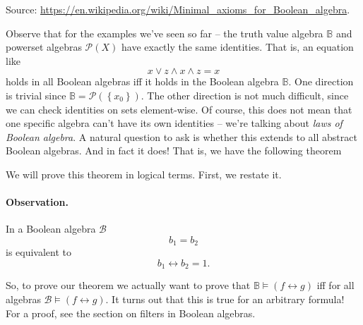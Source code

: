 
Source: \url{https://en.wikipedia.org/wiki/Minimal_axioms_for_Boolean_algebra}.

Observe that for the examples we've seen so far -- the truth value algebra \( \mathbb{B} \) and powerset algebras \( \mathcal{P}(X) \) have exactly the same identities. That is, an equation like
\[ 
    x \vee z \wedge x \wedge z = x 
\]
holds in all Boolean algebras iff it holds in the Boolean algebra \( \mathbb{B} \). One direction is trivial since \( \mathbb{B} = \mathcal{P}( \left\{  x_0 \right\} ) \). The other direction is not much difficult, since we can check identities on sets element-wise. Of course, this does not mean that one specific algebra can't have its own identities -- we're talking about \emph{laws of Boolean algebra}. A natural question to ask is whether this extends to all abstract Boolean algebras. And in fact it does! That is, we have the following theorem

We will prove this theorem in logical terms. First, we restate it.
\paragraph{Observation.} In a Boolean algebra \( \mathcal{B} \)
\[ 
    b_1 = b_2 
\]
is equivalent to
\[ 
    b_1 \leftrightarrow b_2 = 1. 
\]
So, to prove our theorem we actually want to prove that \( \mathbb{B} \models (f \leftrightarrow g) \) iff for all algebras \( \mathcal{B} \models (f \leftrightarrow g) \). It turns out that this is true for an arbitrary formula! For a proof, see the section on filters in Boolean algebras.

